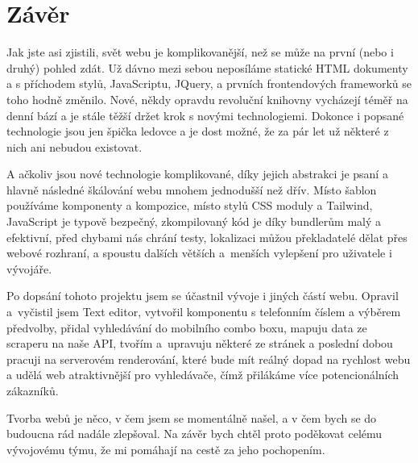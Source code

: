 \chapter*{Závěr}

Jak jste asi zjistili, svět webu je komplikovanější, než se může na první (nebo i druhý) pohled zdát. Už dávno mezi sebou neposíláme statické HTML dokumenty a s příchodem stylů, JavaScriptu, JQuery, a prvních frontendových frameworků se toho hodně změnilo. Nové, někdy opravdu revoluční knihovny vycházejí téměř na denní bází a je stále těžší držet krok s novými technologiemi. Dokonce i popsané technologie jsou jen špička ledovce a je dost možné, že za pár let už některé z nich ani nebudou existovat.

A ačkoliv jsou nové technologie komplikované, díky jejich abstrakci je psaní a hlavně následné škálování webu mnohem jednodušší než dřív. Místo šablon používáme komponenty a kompozice, místo stylů CSS moduly a Tailwind, JavaScript je typově bezpečný, zkompilovaný kód je díky bundlerům malý a efektivní, před chybami nás chrání testy, lokalizaci můžou překladatelé dělat přes webové rozhraní, a spoustu dalších větších a~menších vylepšení pro uživatele i vývojáře.

Po dopsání tohoto projektu jsem se účastnil vývoje i jiných částí webu. Opravil a~vyčistil jsem Text editor, vytvořil komponentu s telefonním číslem a výběrem předvolby, přidal vyhledávání do mobilního combo boxu, mapuju data ze scraperu na naše API, tvořím a~upravuju některé ze stránek a poslední dobou pracuji na serverovém renderování, které bude mít reálný dopad na rychlost webu a udělá web atraktivnější pro vyhledávače, čímž přilákáme více potencionálních zákazníků.

Tvorba webů je něco, v čem jsem se momentálně našel, a v čem bych se do budoucna rád nadále zlepšoval. Na závěr bych chtěl proto poděkovat celému vývojovému týmu, že mi pomáhají na cestě za jeho pochopením.